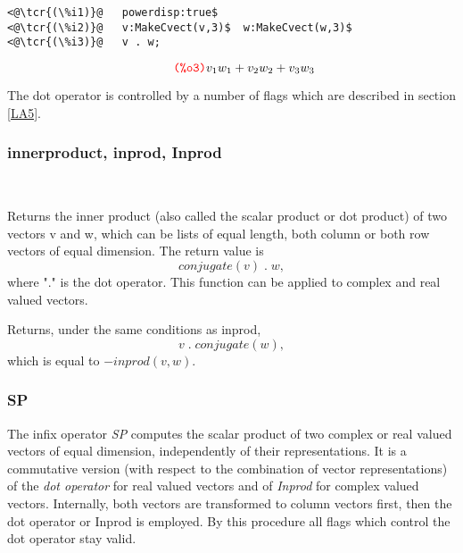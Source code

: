\documentclass[../Maxima_Workbook.tex]{subfiles}
\begin{document}
\lz \begin{small}
\color{blue}
\begin{lstlisting}
<@\tcr{(\%i1)}@   powerdisp:true$
<@\tcr{(\%i2)}@   v:MakeCvect(v,3)$  w:MakeCvect(w,3)$
<@\tcr{(\%i3)}@   v . w;
\end{lstlisting}
\vspace{-6mm} \[\tag*{\tcr{\ttfamily (\%o3)}} v_1w_1 + v_2w_2 + v_3w_3 \]
\color{black}
\end{small}

\vspace{-4mm} The dot operator is controlled by a number of flags which are described in section \ref{LA5}.

\subsubsection{innerproduct, inprod, Inprod}

\lzz {} \hfill {} \\
 \hfill {}

\lz Returns the inner product (also called the scalar product or dot product) of two vectors v and w, which can be lists of equal length, both column or both row vectors of equal dimension. The return value is
\begin{equation*}
	conjugate(v) \; . \; w,
\end{equation*}
where "." is the dot operator. This function can be applied to complex and real valued vectors.

\lzz {} \hfill {}

\lz Returns, under the same conditions as inprod,
\begin{equation*}
	v \; . \; conjugate(w),
\end{equation*}
which is equal to $ -inprod(v,w) $.

\subsubsection{SP}

\lzz {} \hfill {}

\lz The infix operator \emph{SP} computes the scalar product of two complex or real valued vectors of equal dimension, independently of their representations. It is a commutative version (with respect to the combination of vector representations) of the \emph{dot operator} for real valued vectors and of \emph{Inprod} for complex valued vectors. Internally, both vectors are transformed to column vectors first, then the dot operator or Inprod is employed. By this procedure all flags which control the dot operator stay valid. 
\end{document}
